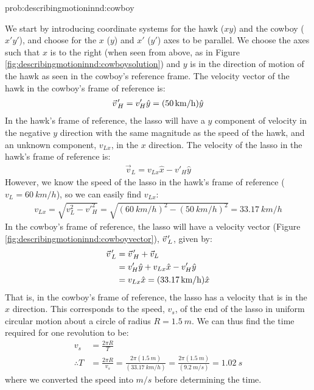 \begin{solution}{prob:describingmotioninnd:cowboy}
\begin{enumerate}[label=\alph*)]
We start by introducing coordinate systems for the hawk  ($xy$) and the cowboy ($x'y'$), and choose for the $x$ ($y$) and $x'$ ($y'$) axes to be parallel. We choose the axes such that $x$ is to the right (when seen from above, as in Figure \ref{fig:describingmotioninnd:cowboysolution}) and $y$ is in the direction of motion of the hawk as seen in the cowboy's reference frame. The velocity vector of the hawk in the cowboy's frame of reference is:
\begin{align*}
\pvec v'_H =  v'_H \hat y = (\SI{50}{km/h})\hat y
\end{align*}
In the hawk's frame of reference, the lasso will have a $y$ component of velocity in the negative $y$ direction with the same magnitude as the speed of the hawk, and an unknown component, $v_{Lx}$, in the $x$ direction. The velocity of the lasso in the hawk's frame of reference is:
\begin{align*}
\vec v_L=v_{Lx}\hat x - v'_H \hat y
\end{align*}
However, we know the speed of the lasso in the hawk's frame of reference ($v_L=\SI{60}{km/h}$), so we can easily find $v_{Lx}$:
\begin{align*}
v_{Lx}=\sqrt{v_L^2-v'^2_H}=\sqrt{(\SI{60}{km/h})^2-(\SI{50}{km/h})^2}=\SI{33.17}{km/h}
\end{align*}
In the cowboy's frame of reference, the lasso will have a velocity vector (Figure \ref{fig:describingmotioninnd:cowboyvector}), $\pvec v'_L$, given by:
\begin{align*}
\pvec v'_L &= \pvec v'_H + \vec v_L\\
&= v'_H \hat y + v_{Lx}\hat x - v'_H \hat y\\
&=v_{Lx}\hat x = (\SI{33.17}{km/h})\hat x
\end{align*}
That is, in the cowboy's frame of reference, the lasso has a velocity that is in the $x$ direction. This corresponds to the speed, $v_s$, of the end of the lasso in uniform circular motion about a circle of radius $R=\SI{1.5}{m}$. We can thus find the time required for one revolution to be:
\begin{align*}
v_s &= \frac{2\pi R}{T}\\
\therefore T &= \frac{2\pi R}{v_s} =\frac{2\pi (\SI{1.5}{m})}{(\SI{33.17}{km/h})} = \frac{2\pi (\SI{1.5}{m})}{(\SI{9.2}{m/s})}=\SI{1.02}{s}
\end{align*}
where we converted the speed into $\si{m/s}$ before determining the time.



\end{enumerate}
\end{solution}

